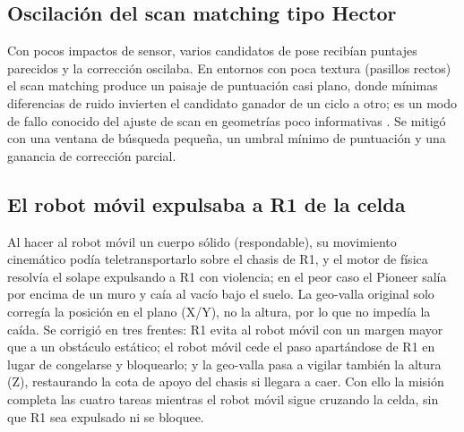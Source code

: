 \subsection{Oscilación del scan matching tipo Hector}
Con pocos impactos de sensor, varios candidatos de pose recibían puntajes
parecidos y la corrección oscilaba. En entornos con poca textura (pasillos
rectos) el scan matching produce un paisaje de puntuación casi plano, donde
mínimas diferencias de ruido invierten el candidato ganador de un ciclo a otro;
es un modo de fallo conocido del ajuste de scan en geometrías poco informativas
\cite{thrun2005}. Se mitigó con una ventana de búsqueda pequeña, un umbral mínimo
de puntuación y una ganancia de corrección parcial.

\subsection{El robot móvil expulsaba a R1 de la celda}
Al hacer al robot móvil un cuerpo sólido (respondable), su movimiento cinemático
podía teletransportarlo sobre el chasis de R1, y el motor de física resolvía el
solape expulsando a R1 con violencia; en el peor caso el Pioneer salía por encima
de un muro y caía al vacío bajo el suelo. La geo-valla original solo corregía la
posición en el plano (X/Y), no la altura, por lo que no impedía la caída. Se
corrigió en tres frentes: R1 evita al robot móvil con un margen mayor que a un
obstáculo estático; el robot móvil cede el paso apartándose de R1 en lugar de
congelarse y bloquearlo; y la geo-valla pasa a vigilar también la altura (Z),
restaurando la cota de apoyo del chasis si llegara a caer. Con ello la misión
completa las cuatro tareas mientras el robot móvil sigue cruzando la celda, sin
que R1 sea expulsado ni se bloquee.
